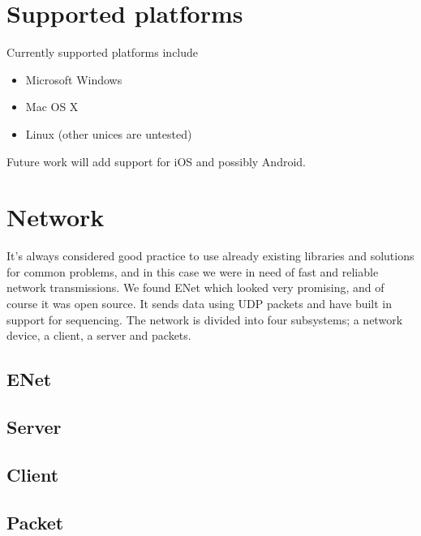 \section{Supported platforms}
Currently supported platforms include
\begin{itemize}
\item Microsoft Windows
\item Mac OS X
\item Linux (other unices are untested)
\end{itemize}
Future work will add support for iOS and possibly Android.

\section{Network}
It's always considered good practice to use already existing libraries and solutions for common problems, and in this case we were in need of fast and reliable network transmissions.
We found ENet which looked very promising, and of course it was open source. It sends data using UDP packets and have built in support for sequencing.
The network is divided into four subsystems; a network device, a client, a server and packets.
\subsection{ENet}
\subsection{Server}
\subsection{Client}
\subsection{Packet}

